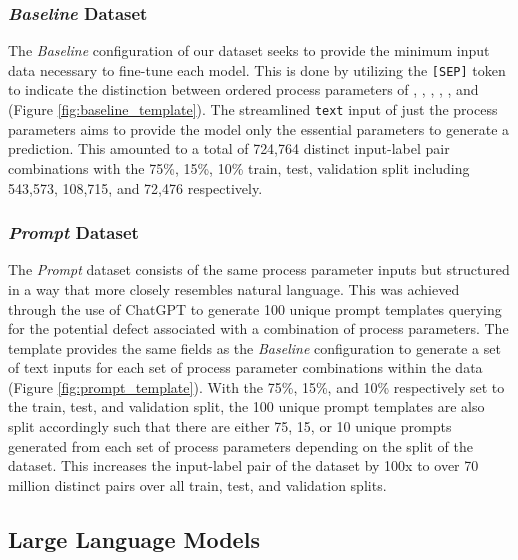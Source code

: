 \subsubsection{\textit{Baseline} Dataset}

The \textit{Baseline} configuration of our dataset seeks to provide the minimum
input data necessary to fine-tune each model. This is done by utilizing the
\texttt{[SEP]} token to indicate the distinction between ordered process
parameters of \texttt{}, \texttt{},
\texttt{}, \texttt{},
\texttt{}, and \texttt{}
(Figure \ref{fig:baseline_template}). The streamlined \texttt{text} input of
just the process parameters aims to provide the model only the essential
parameters to generate a prediction. This amounted to a total of 724,764
distinct input-label pair combinations with the 75\%, 15\%, 10\% train, test,
validation split including 543,573, 108,715, and 72,476 respectively.

\subsubsection{\textit{Prompt} Dataset}

The \textit{Prompt} dataset consists of the same process parameter inputs but
structured in a way that more closely resembles natural language. This was
achieved through the use of ChatGPT to generate 100 unique prompt templates
querying for the potential defect associated with a combination of process
parameters. The template provides the same fields as the \textit{Baseline}
configuration to generate a set of text inputs for each set of process parameter
combinations within the data (Figure \ref{fig:prompt_template}). With the 75\%,
15\%, and 10\% respectively set to the train, test, and validation split, the
100 unique prompt templates are also split accordingly such that there are
either 75, 15, or 10 unique prompts generated from each set of process
parameters depending on the split of the dataset. This increases the input-label
pair of the dataset by 100x to over 70 million distinct pairs over all train,
test, and validation splits.


\subsection{Large Language Models}

